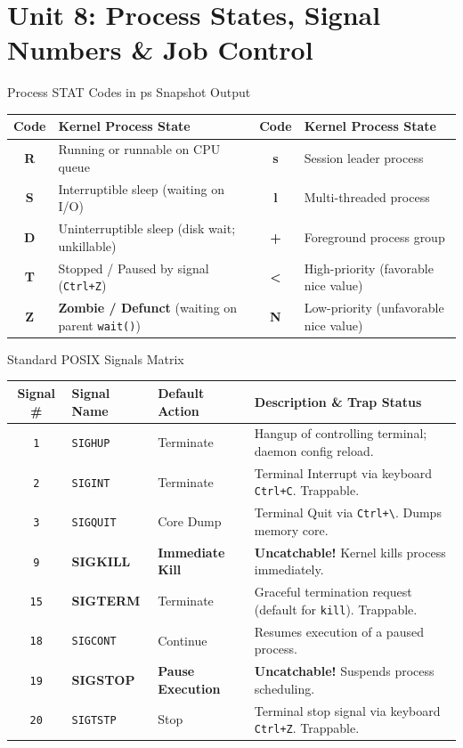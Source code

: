 \chapter{Unit 8: Process States, Signal Numbers \& Job Control}

\begin{cheatbox}{Process STAT Codes in ps Snapshot Output}
\begin{tabularx}{\linewidth}{c X c X}
\toprule
\textbf{Code} & \textbf{Kernel Process State} & \textbf{Code} & \textbf{Kernel Process State} \\
\midrule
\textbf{R} & Running or runnable on CPU queue & \textbf{s} & Session leader process \\
\textbf{S} & Interruptible sleep (waiting on I/O) & \textbf{l} & Multi-threaded process \\
\textbf{D} & Uninterruptible sleep (disk wait; unkillable) & \textbf{+} & Foreground process group \\
\textbf{T} & Stopped / Paused by signal (\texttt{Ctrl+Z}) & \textbf{<} & High-priority (favorable nice value) \\
\textbf{Z} & \textbf{Zombie / Defunct} (waiting on parent \texttt{wait()}) & \textbf{N} & Low-priority (unfavorable nice value) \\
\bottomrule
\end{tabularx}
\end{cheatbox}

\begin{syntaxbox}{Standard POSIX Signals Matrix}
\begin{tabularx}{\linewidth}{c l l X}
\toprule
\textbf{Signal \#} & \textbf{Signal Name} & \textbf{Default Action} & \textbf{Description \& Trap Status} \\
\midrule
\texttt{1} & \texttt{SIGHUP} & Terminate & Hangup of controlling terminal; daemon config reload. \\
\texttt{2} & \texttt{SIGINT} & Terminate & Terminal Interrupt via keyboard \texttt{Ctrl+C}. Trappable. \\
\texttt{3} & \texttt{SIGQUIT} & Core Dump & Terminal Quit via \texttt{Ctrl+\textbackslash}. Dumps memory core. \\
\texttt{9} & \textbf{SIGKILL} & \textbf{Immediate Kill} & \textbf{Uncatchable!} Kernel kills process immediately. \\
\texttt{15} & \textbf{SIGTERM} & Terminate & Graceful termination request (default for \texttt{kill}). Trappable. \\
\texttt{18} & \texttt{SIGCONT} & Continue & Resumes execution of a paused process. \\
\texttt{19} & \textbf{SIGSTOP} & \textbf{Pause Execution} & \textbf{Uncatchable!} Suspends process scheduling. \\
\texttt{20} & \texttt{SIGTSTP} & Stop & Terminal stop signal via keyboard \texttt{Ctrl+Z}. Trappable. \\
\bottomrule
\end{tabularx}
\end{syntaxbox}

